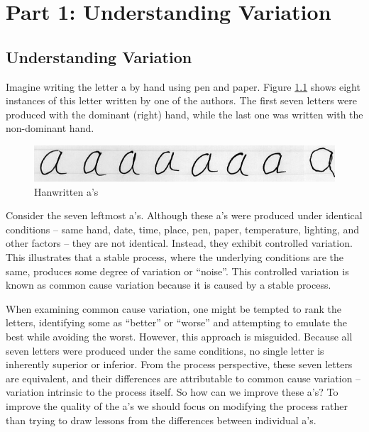 \documentclass[
]{book}
\begin{document}
\part*{Part 1: Understanding Variation}\label{part-part-1-understanding-variation}

\chapter{Understanding Variation}\label{variation}

Imagine writing the letter a by hand using pen and paper. Figure \ref{fig:variation-fig1} shows eight instances of this letter written by one of the authors. The first seven letters were produced with the dominant (right) hand, while the last one was written with the non-dominant hand.

\begin{figure}
\includegraphics[width=8.53in]{figures/handwritten1} \caption{Hanwritten a's}\label{fig:variation-fig1}
\end{figure}

Consider the seven leftmost a's. Although these a's were produced under identical conditions -- same hand, date, time, place, pen, paper, temperature, lighting, and other factors -- they are not identical. Instead, they exhibit controlled variation. This illustrates that a stable process, where the underlying conditions are the same, produces some degree of variation or ``noise''. This controlled variation is known as common cause variation because it is caused by a stable process.

When examining common cause variation, one might be tempted to rank the letters, identifying some as ``better'' or ``worse'' and attempting to emulate the best while avoiding the worst. However, this approach is misguided. Because all seven letters were produced under the same conditions, no single letter is inherently superior or inferior. From the process perspective, these seven letters are equivalent, and their differences are attributable to common cause variation -- variation intrinsic to the process itself. So how can we improve these a's? To improve the quality of the a's we should focus on modifying the process rather than trying to draw lessons from the differences between individual a's.
\end{document}
